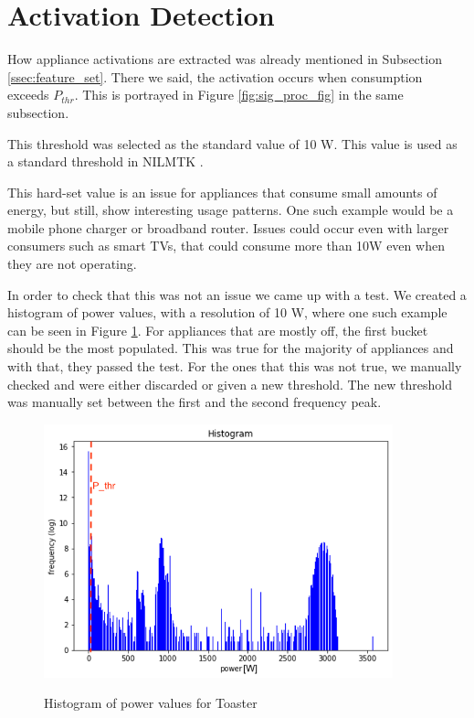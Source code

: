 \section{Activation Detection}

How appliance activations are extracted was already mentioned in Subsection \ref{ssec:feature_set}.
There we said, the activation occurs when consumption exceeds $P_{thr}$.
This is portrayed in Figure \ref{fig:sig_proc_fig} in the same subsection.

This threshold was selected as the standard value of 10 W.
This value is used as a standard threshold in NILMTK \cite{nilmtk}.

This hard-set value is an issue for appliances that consume small amounts of energy,
but still, show interesting usage patterns.
One such example would be a mobile phone charger or broadband router.
Issues could occur even with larger consumers such as smart TVs, that could consume more than 10W even when they are not operating.

In order to check that this was not an issue we came up with a test.
We created a histogram of power values, with a resolution of 10 W, where one such example can be seen in Figure \ref{fig:freq_pthr}.
For appliances that are mostly off, the first bucket should be the most populated.
This was true for the majority of appliances and with that, they passed the test.
For the ones that this was not true, we manually checked and were either discarded or given a new threshold.
The new threshold was manually set between the first and the second frequency peak. 

\begin{figure}[H]
	\centering
	\caption{Histogram of power values for Toaster}
	\includegraphics[width=0.9\textwidth]{Figures/profile_sketches/freq_pthr.png}
	\label{fig:freq_pthr}
\end{figure}

